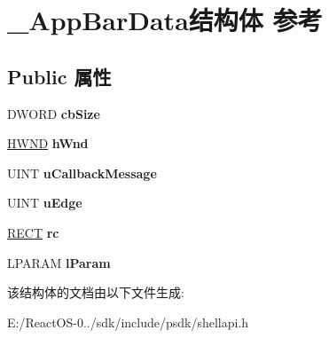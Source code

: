 \hypertarget{struct___app_bar_data}{}\section{\+\_\+\+App\+Bar\+Data结构体 参考}
\label{struct___app_bar_data}
\subsection*{Public 属性}
\begin{DoxyCompactItemize}
\item 
\mbox{\label{struct___app_bar_data_a3b95f32607548928f1c780645ac8c8a5}} 
D\+W\+O\+RD {\bfseries cb\+Size}
\item 
\mbox{\label{struct___app_bar_data_af4c2cebd4898d6277b2fd9eea9259251}} 
\hyperlink{interfacevoid}{H\+W\+ND} {\bfseries h\+Wnd}
\item 
\mbox{\label{struct___app_bar_data_a2ae728df0b833d0a7f423cb6c3f8e926}} 
U\+I\+NT {\bfseries u\+Callback\+Message}
\item 
\mbox{\label{struct___app_bar_data_af8f9dd4e0e8af219c31e11829fc21265}} 
U\+I\+NT {\bfseries u\+Edge}
\item 
\mbox{\label{struct___app_bar_data_a6e562f94c551b158ee5459c7f04bb482}} 
\hyperlink{structtag_r_e_c_t}{R\+E\+CT} {\bfseries rc}
\item 
\mbox{\label{struct___app_bar_data_a74b58b4dc194807602953e76840a6d52}} 
L\+P\+A\+R\+AM {\bfseries l\+Param}
\end{DoxyCompactItemize}


该结构体的文档由以下文件生成\+:\begin{DoxyCompactItemize}
\item 
E\+:/\+React\+O\+S-\/0../sdk/include/psdk/shellapi.\+h\end{DoxyCompactItemize}

